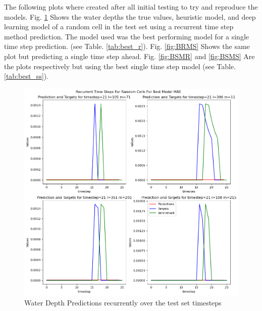 The following plots where created after all initial testing to try and reproduce the models. Fig. \ref{fig:BRMR} Shows the water depths the true values, heuristic model, and deep learning model of a random cell in the test set using a recurrent time step method prediction. The model used was the best performing model for a single time step prediction.  (see Table. \ref{tab:best_r}). Fig. \ref{fig:BRMS} Shows the same plot but predicting a single time step ahead. Fig. \ref{fig:BSMR} and \ref{fig:BSMS} Are the plots respectively but using the best single time step model (see Table. \ref{tab:best_ss}).

\begin{figure}[tbph]
	\centering
	\includegraphics[width=0.8\linewidth, height=0.3\textheight]{Figures/Results/Final_Results/Best_Model_recurrentMAE_recurrent_random_cell}
	\caption[Best Recurrent MAE random cell over time]{Water Depth Predictions recurrently over the test set timesteps}
	\label{fig:BRMR}
\end{figure}



